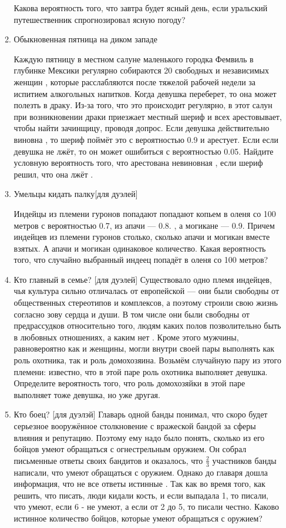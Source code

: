 \documentclass[11pt, a4paper]{article}
\theoremstyle{definition}
\begin{document}
\begin{enumerate}
\begin{enumerate}
    Какова вероятность того, что завтра будет ясный день, если уральский путешественник спрогнозировал ясную погоду?
    \item Обыкновенная пятница на диком западе 

    Каждую пятницу в местном салуне маленького городка Фемвиль в глубинке Мексики регулярно собираются 20 свободных и независимых женщин  , которые расслабляются после тяжелой рабочей недели за испитием алкогольных напитков. Когда девушка переберет, то она может полезть в драку. Из-за того, что это происходит регулярно, в этот салун при возникновении драки приезжает местный шериф и всех арестовывает, чтобы найти зачинщицу, проводя допрос. Если девушка действительно виновна , то шериф поймёт это с вероятностью 0.9 и арестует. Если если девушка не лжёт, то он может ошибиться с вероятностью 0.05. Найдите условную вероятность того, что арестована невиновная , если шериф решил, что она лжёт .
    \item Умельцы кидать палку[для дуэлей]

    Индейцы из племени гуронов попадают попадают копьем в оленя со 100 метров с вероятностью 0.7, из апачи — 0.8. , а могикане — 0.9. Причем индейцев из племени гуронов столько, сколько апачи и могикан вместе взятых. А апачи и могикан одинаковое количество. Какая вероятность того, что случайно выбранный индеец попадёт в оленя со 100 метров? 
    \item Кто главный в семье? [для дуэлей]
    \newline
    Существовало одно племя индейцев, чья культура сильно отличалась от европейской — они были свободны от общественных стереотипов и комплексов, а поэтому строили свою жизнь согласно зову сердца и души. В том числе они были свободны от предрассудков относительно того, людям каких полов позволительно быть в любовных отношениях, а каким нет . Кроме этого мужчины, равновероятно как и женщины, могли внутри своей пары выполнять как роль охотника, так и роль  домохозяина. Возьмём случайную пару из этого племени: известно, что в этой паре роль охотника выполняет девушка. Определите вероятность того, что роль домохозяйки в этой паре выполняет тоже девушка, но уже другая. 
    \item Кто боец? [для дуэлэй]
    \newline
    Главарь одной банды понимал, что скоро будет серьезное вооружённое столкновение с вражеской бандой за сферы влияния и репутацию. Поэтому ему надо было понять, сколько из его бойцов умеют обращаться с огнестрельным оружием. Он собрал письменные ответы своих бандитов и оказалось, что $\frac{2}{3}$ участников банды написали, что умеют обращаться с оружием. Однако до главаря дошла информация, что не все ответы истинные . Так как во время того, как решить, что писать, люди кидали кость, и если выпадала 1, то писали, что умеют, если 6 - не умеют, а если от 2 до 5, то писали честно. Каково истинное количество бойцов, которые умеют обращаться с оружием? 
\end{enumerate}    
    

\end{enumerate}
\end{document}
